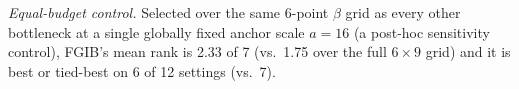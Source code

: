 \emph{Equal-budget control.} Selected over the same 6-point $\beta$ grid as every other bottleneck at a single globally fixed anchor scale $a=16$ (a post-hoc sensitivity control), FGIB's mean rank is 2.33 of 7 (vs.\ 1.75 over the full $6\times9$ grid) and it is best or tied-best on 6 of 12 settings (vs.\ 7).
